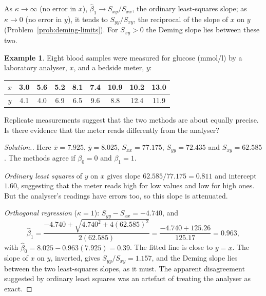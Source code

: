 \documentclass[11pt,a4paper]{article}
\numberwithin{equation}{section}
\theoremstyle{definition}
\newtheorem{exa}[thm]{Example}
\newenvironment{solution}
  {\renewcommand{\qedsymbol}{}\begin{proof}[\textit{Solution}.]}
  {\end{proof}}
\begin{document}
As $\kappa \to \infty$ (no error in $x$), $\hat\beta_1 \to S_{xy}/S_{xx}$, the ordinary least-squares slope; as $\kappa \to 0$ (no error in $y$), it tends
to $S_{yy}/S_{xy}$, the reciprocal of the slope of $x$ on $y$ (Problem~\ref{prob:deming-limits}). For $S_{xy} > 0$ the Deming slope lies
between these two.

\begin{exa}\label{exa:methods-compare}
Eight blood samples were measured for glucose (mmol/l) by a laboratory analyser, $x$, and a bedside meter, $y$:
\begin{center}
\begin{tabular}{c|cccccccc}
$x$ & 3.0 & 5.6 & 5.2 & 8.1 & 7.4 & 10.9 & 10.2 & 13.0 \\
\hline
$y$ & 4.1 & 4.0 & 6.9 & 6.5 & 9.6 & 8.8 & 12.4 & 11.9 \\
\end{tabular}
\end{center}
Replicate measurements suggest that the two methods are about equally precise. Is there evidence that the
meter reads differently from the analyser?
\end{exa}

\begin{solution}
Here $\bar x = 7.925$, $\bar y = 8.025$, $S_{xx} = 77.175$, $S_{yy} = 72.435$ and $S_{xy} = 62.585$. The methods agree if $\beta_0 = 0$ and $\beta_1 = 1$.

\emph{Ordinary least squares} of $y$ on $x$ gives slope $62.585/77.175 = 0.811$ and intercept $1.60$, suggesting that the meter
reads high for low values and low for high ones. But the analyser's readings have errors too, so this slope is
attenuated.

\emph{Orthogonal regression} ($\kappa = 1$): $S_{yy} - S_{xx} = -4.740$, and
\[
\hat\beta_1 = \frac{-4.740 + \sqrt{4.740^2 + 4(62.585)^2}}{2(62.585)} = \frac{-4.740 + 125.26}{125.17} = 0.963 ,
\]
with $\hat\beta_0 = 8.025 - 0.963(7.925) = 0.39$. The fitted line is close to $y = x$. The slope of $x$ on $y$, inverted, gives
$S_{yy}/S_{xy} = 1.157$, and the Deming slope lies between the two least-squares slopes, as it must. The apparent
disagreement suggested by ordinary least squares was an artefact of treating the analyser as exact.
\end{solution}
\end{document}
